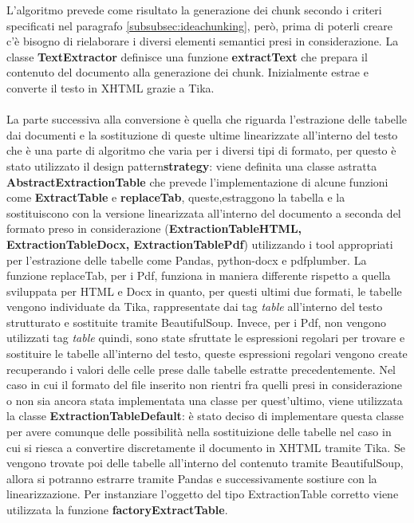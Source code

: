 \noindent L'algoritmo prevede come risultato la generazione dei chunk secondo i criteri specificati nel paragrafo \ref{subsubsec:ideachunking}, però, prima di poterli creare c'è bisogno di rielaborare i diversi elementi semantici presi in considerazione.
La classe \textbf{TextExtractor} definisce una funzione \textbf{extractText} che prepara il contenuto del documento alla generazione dei chunk. Inizialmente estrae e converte il testo in XHTML grazie a Tika.
\\\\La parte successiva alla conversione è quella che riguarda l'estrazione delle tabelle dai documenti e la sostituzione di queste ultime linearizzate all'interno del testo che è una parte di algoritmo che varia per i diversi tipi di formato, per questo è stato utilizzato 
il \gls{design pattern}\glsfirstoccur \textbf{\gls{strategy}}\glsfirstoccur: viene definita una classe astratta \textbf{AbstractExtractionTable} che prevede l'implementazione di alcune funzioni come \textbf{ExtractTable} e \textbf{replaceTab}, queste,estraggono la tabella e la sostituiscono con la versione linearizzata all'interno del documento
a seconda del formato preso in considerazione (\textbf{ExtractionTableHTML, ExtractionTableDocx, ExtractionTablePdf}) utilizzando i tool appropriati per l'estrazione delle tabelle come Pandas, python-docx e pdfplumber.
La funzione replaceTab, per i Pdf, funziona in maniera differente rispetto a quella sviluppata per HTML e Docx in quanto, per questi ultimi due formati, le tabelle vengono individuate da Tika, rappresentate dai tag \emph{table} all'interno del testo strutturato e sostituite tramite BeautifulSoup.
Invece, per i Pdf, non vengono utilizzati tag \emph{table} quindi, sono state sfruttate le espressioni regolari per trovare e sostituire le tabelle all'interno del testo, queste espressioni regolari vengono create recuperando i valori delle celle prese dalle tabelle estratte precedentemente.
Nel caso in cui il formato del file inserito non rientri fra quelli presi in considerazione o non sia ancora stata implementata una classe per quest'ultimo, viene utilizzata la classe \textbf{ExtractionTableDefault}: è stato deciso di implementare questa classe per avere comunque delle possibilità nella sostituizione delle tabelle nel caso in cui si riesca a convertire discretamente il documento in XHTML tramite Tika.
Se vengono trovate poi delle tabelle all'interno del contenuto tramite BeautifulSoup, allora si potranno estrarre tramite Pandas e successivamente sostiure con la linearizzazione.
Per instanziare l'oggetto del tipo ExtractionTable corretto viene utilizzata la funzione \textbf{factoryExtractTable}. 
